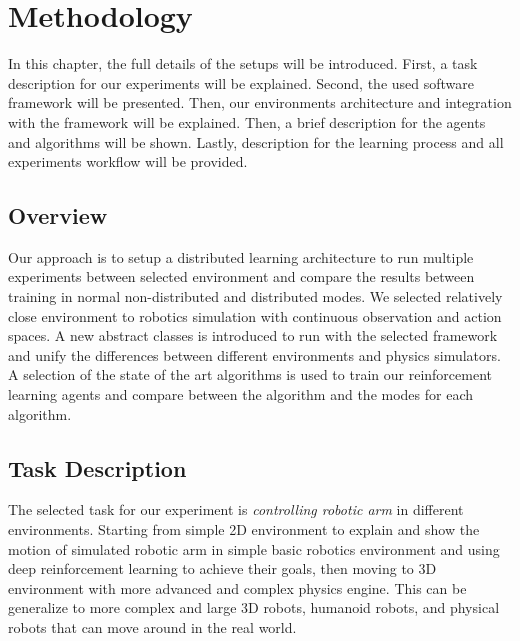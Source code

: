
\chapter{Methodology}\label{chapter:setup_and_implementation}

In this chapter, the full details of the setups will be introduced. First, a task description for our experiments will be explained. Second, the used software framework will be presented. Then, our environments architecture and integration with the framework will be explained. Then, a brief description for the agents and algorithms will be shown. Lastly, description for the learning process and all experiments workflow will be provided.

\section{Overview}

Our approach is to setup a distributed learning architecture to run multiple experiments between selected environment and compare the results between training in normal non-distributed and distributed modes. We selected relatively close environment to robotics simulation with continuous observation and action spaces. A new abstract classes is introduced to run with the selected framework and unify the differences between different environments and physics simulators. A selection of the state of the art algorithms is used to train our reinforcement learning agents and compare between the algorithm and the modes for each algorithm.

\section{Task Description}

The selected task for our experiment is \textit{controlling robotic arm} in different environments. Starting from simple 2D environment to explain and show the motion of simulated robotic arm in simple basic robotics environment and using deep reinforcement learning to achieve their goals, then moving to 3D environment with more advanced and complex physics engine. This can be generalize to more complex and large 3D robots, humanoid robots, and physical robots that can move around in the real world.

